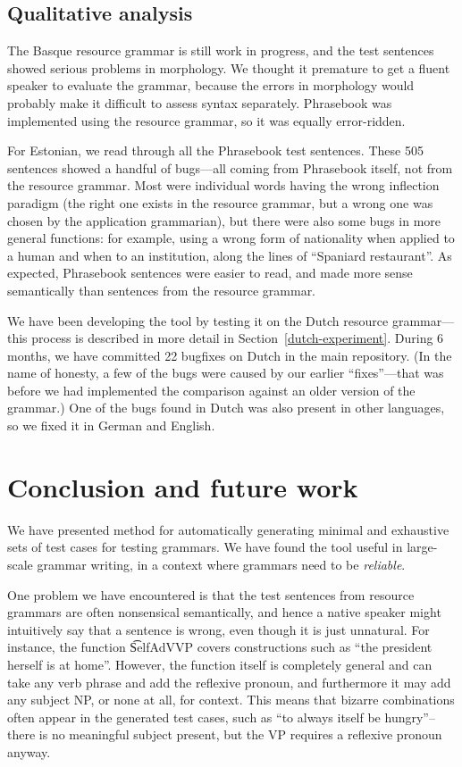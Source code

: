 \subsection{Qualitative analysis}

The Basque resource grammar is still work in progress, and the test
sentences showed serious problems in morphology. We thought it
premature to get a fluent speaker to evaluate the grammar, because the
errors in morphology would probably make it difficult to assess syntax
separately. Phrasebook was implemented using the resource grammar, so
it was equally error-ridden.

For Estonian, we read through all the Phrasebook test sentences. These
505 sentences showed a handful of bugs---all coming from Phrasebook
itself, not from the resource grammar. Most were individual words
having the wrong inflection paradigm (the right one exists in the
resource grammar, but a wrong one was chosen by the application
grammarian), but there were also some bugs in more general
functions: for example, using a wrong form of nationality when applied
to a human and when to an institution, along the lines of ``Spaniard
restaurant''. As expected, Phrasebook sentences were easier to read,
and made more sense semantically than sentences from the resource
grammar.

We have been developing the tool by testing it on the Dutch resource
grammar---this process is described in more detail in
Section~\ref{dutch-experiment}. During 6 months, we have committed 22
bugfixes on Dutch in the \gf{} main repository. (In the name of
honesty, a few of the bugs were caused by our earlier “fixes”—that was
before we had implemented the comparison against an older version of
the grammar.) One of the bugs found in Dutch was also present in other
languages, so we fixed it in German and English.



\section{Conclusion and future work}
\label{gf-future}

We have presented method for automatically generating minimal and
exhaustive sets of test cases for testing grammars.  We have found the
tool useful in large-scale grammar writing, in a context where
grammars need to be \emph{reliable}.

One problem we have encountered is that the test sentences from
resource grammars are often nonsensical semantically, and hence a
native speaker might intuitively say that a sentence is wrong, even
though it is just unnatural.  For instance, the function \t{SelfAdVVP}
covers constructions such as ``the president herself is at
home''. However, the function itself is completely general and can
take any verb phrase and add the reflexive pronoun, and furthermore it
may add any subject NP, or none at all, for context. This means that bizarre
combinations often appear in the generated test cases, such as
``to always itself be hungry''--there is no meaningful subject present, but the
VP requires a reflexive pronoun anyway.

